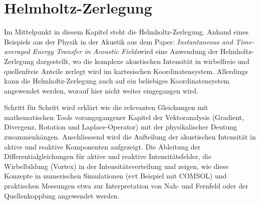 %
%
%
%
\chapter{Helmholtz-Zerlegung\label{chapter:helmholtz}}
\begin{refsection}

Im Mittelpunkt in diesem Kapitel steht die Helmholtz-Zerlegung. Anhand eines Beispiels aus der Physik in der Akustik aus dem Paper: \glqq \textit{Instantaneous and Time-averaged Energy Transfer in Acoustic Fields}\grqq wird eine Anwendung der Helmholtz-Zerlegung dargestellt, wo die komplexe akustischen Intensität in wirbelfreie und quellenfreie Anteile zerlegt wird im kartesischen Koordinatensystem. Allerdings kann die Helmholtz-Zerlegung auch auf ein beliebiges Koordinatensystem angewendet werden, worauf hier nicht weiter eingegangen wird. \newline


Schritt für Schritt wird erklärt wie die relevanten Gleichungen mit mathematischen Tools vorangegangener Kapitel der Vektoranalysis (Gradient, Divergenz, Rotation und Laplace-Operator) mit der physikalischer Deutung zusammenhängen. Anschliessend wird die Aufteilung der akustischen Intensität in aktive und reaktive Komponenten aufgezeigt. Die Ableitung der Differentialgleichungen für aktive und reaktive Intensitätsfelder, die Wirbelbildung (Vortex) in der Intensitätsverteilung und zeigen, wie diese Konzepte in numerischen Simulationen (evt Beispiel mit COMSOL) und praktischen Messungen etwa zur Interpretation von Nah- und Fernfeld oder der Quellenkopplung angewendet werden.








\printbibliography[heading=subbibliography]
\end{refsection}
